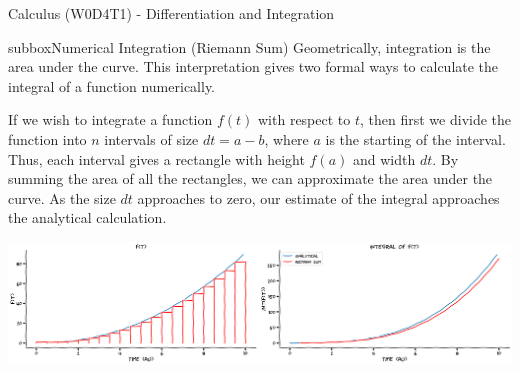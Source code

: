\begin{textbox}{Calculus (W0D4T1) - Differentiation and Integration}
\begin{subbox}{subbox}{Numerical Integration (Riemann Sum)}
Geometrically, integration is the area under the curve. This interpretation gives two formal ways to calculate the integral of a function numerically. 

If we wish to integrate a function $f(t)$ with respect to $t$, then first we divide the function into $n$ intervals of size $dt = a-b$, where $a$ is the starting of the interval. Thus, each interval gives a rectangle with height $f(a)$ and width $dt$. By summing the area of all the rectangles, we can approximate the area under the curve. As the size $dt$ approaches to zero, our estimate of the integral approaches the analytical calculation. 

\centering
\includegraphics[scale=0.12]{Figures/PreCourse/CFigure4.png}
\end{subbox}


\end{textbox}
